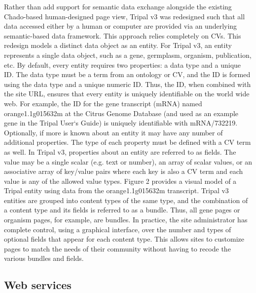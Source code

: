 Rather than add support for semantic data exchange alongside the existing Chado-based human-designed page view, Tripal v3 was redesigned such that all data accessed either by a human or computer are provided via an underlying semantic-based data framework. This approach relies completely on CVs. This redesign models a distinct data object as an entity. For Tripal v3, an entity represents a single data object, such as a gene, germplasm, organism, publication, etc. By default, every entity requires two properties: a data type and a unique ID. The data type must be a term from an ontology or CV, and the ID is formed using the data type and a unique numeric ID. Thus, the ID, when combined with the site URL, ensures that every entity is uniquely identifiable on the world wide web. For example, the ID for the gene transcript (mRNA) named orange1.1g015632m at the Citrus Genome Database (and used as an example gene in the Tripal User`s Guide) is uniquely identifiable with mRNA/732219. Optionally, if more is known about an entity it may have any number of additional properties. The type of each property must be defined with a CV term as well. In Tripal v3, properties about an entity are referred to as fields. The value may be a single scalar (e.g. text or number), an array of scalar values, or an associative array of key/value pairs where each key is also a CV term and each value is any of the allowed value types. Figure 2 provides a visual model of a Tripal entity using data from the orange1.1g015632m transcript. Tripal v3 entities are grouped into content types of the same type, and the combination of a content type and its fields is referred to as a bundle. Thus, all gene pages or organism pages, for example, are bundles. In practice, the site administrator has complete control, using a graphical interface, over the number and types of optional fields that appear for each content type. This allows sites to customize pages to match the needs of their community without having to recode the various bundles and fields.


\subsection*{Web services}

